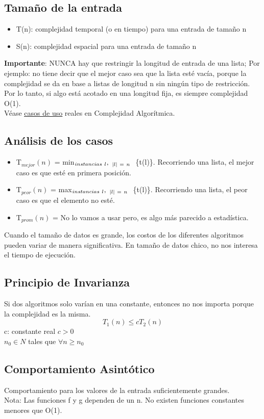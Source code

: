 \documentclass[10pt,a4paper]{article}
\begin{document}
\subsection*{Tamaño de la entrada}
\begin{itemize}
    \item T(n): complejidad temporal (o en tiempo) para una entrada de tamaño n
    \item S(n): complejidad espacial para una entrada de tamaño n
\end{itemize}
\textbf{Importante}: NUNCA hay que restringir la longitud de entrada de una lista; Por ejemplo: no tiene decir que el mejor caso sea que la lista esté vacía, porque la complejidad se da en base a listas de longitud n sin ningún tipo de restricción. Por lo tanto, si algo está acotado en una longitud fija, es siempre complejidad O(1). \\
Véase \hyperref[subsec:ejemplos_complejidad_reales]{\underline{casos de uso}} reales en Complejidad Algorítmica.
\subsection*{Análisis de los casos}
\begin{itemize}
    \item T\(_{mejor}(n)\) = min\(_{instancias \ l},\ _{\longitud{l} \ = \ n}\ \) \{t(l)\}. Recorriendo una lista, el mejor caso es que esté en primera posición.
    \item T\(_{peor}(n)\) = max\(_{instancias \ l},\ _{\longitud{l} \ = \ n}\ \) \{t(l)\}. Recorriendo una lista, el peor caso es que el elemento no esté.
    \item T\(_{prom}(n)\) = No lo vamos a usar pero, es algo más parecido a estadística.
\end{itemize}
Cuando el tamaño de datos es grande, los costos de los diferentes algoritmos pueden variar de manera significativa. En tamaño de datos chico, no nos interesa el tiempo de ejecución.
\subsection*{Principio de Invarianza}
Si dos algoritmos solo varían en una constante, entonces no nos importa porque la complejidad es la misma.
\[T_{1}(n) \le cT_{2}(n)\]
c: constante real  \(c>0\) \\
\(n_{0} \in N\) tales que \(\forall n \ge n_{0}\)
\subsection*{Comportamiento Asintótico}
Comportamiento para los valores de la entrada suficientemente grandes. \\
Nota: Las funciones f y g dependen de un n. No existen funciones constantes menores que O(1).
\end{document}
